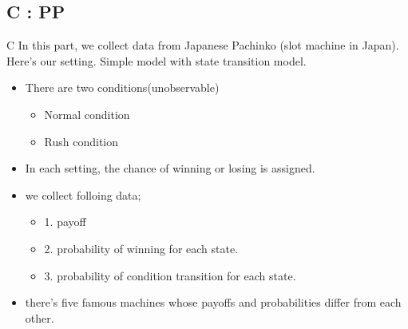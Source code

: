 \documentclass{beamer}
\begin{document}
\subsection{C : PP}

\begin{frame}{C}
In this part, we collect data from Japanese Pachinko (slot machine in Japan).\\
Here's our setting. Simple model with state transition model.
\begin{itemize}
    \item There are two conditions(unobservable)
    \begin{itemize}
        \item Normal condition
        \item Rush condition
    \end{itemize}
    \item In each setting, the chance of winning or losing is assigned.
\end{itemize}
\begin{itemize}
    \item we collect folloing data; 
    \begin{itemize}
        \item 1. payoff
        \item 2. probability of winning for each state.
        \item 3. probability of condition transition for each state.
    \end{itemize}
    \item there's five famous machines whose payoffs and probabilities differ from each other.
\end{itemize}
\end{frame}
\end{document}
